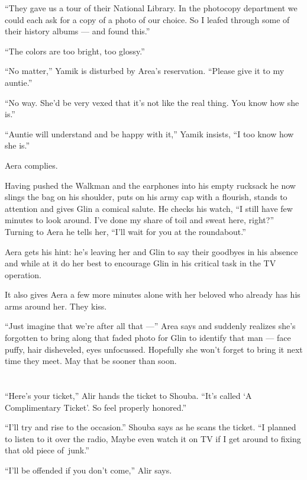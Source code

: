 \documentclass[twoside,11pt]{book}
\begin{document}
``They gave us a tour of their National Library. In the photocopy department we could each ask for a copy
of a photo of our choice. So I leafed through some of their history albums --- and found this.''

``The colors are too bright, too glossy.''

``No matter,'' Yamik is disturbed by Area's reservation. ``Please give it to my
auntie.''

``No way. She'd be very vexed that it's not like the real thing. You know how she is.''

``Auntie will understand and be happy with it,'' Yamik insists, ``I too know how
she is.''

Aera complies.

Having pushed the Walkman and the earphones into his empty rucksack he now slings the bag on his shoulder, puts on his
army cap with a flourish, stands to attention and gives Glin a comical salute. He checks his watch, ``I
still have few minutes to look around. I've done my share of toil and sweat here, right?'' Turning to Aera
he tells her, ``I'll wait for you at the roundabout.''

Aera gets his hint: he's leaving her and Glin to say their goodbyes in his absence and while at it do her best to
encourage Glin in his critical task in the TV operation.

It also gives Aera a few more minutes alone with her beloved who already has his arms around her. They kiss.

``Just imagine that we're after all that ---'' Area says and suddenly realizes she's forgotten
to bring along that faded photo for Glin to identify that man --- face puffy, hair disheveled, eyes unfocussed. Hopefully
she won't forget to bring it next time they meet. May that be sooner than soon.



\chapter{}

``Here's your ticket,'' Alir hands the ticket to Shouba. ``It's called
`A Complimentary Ticket'. So feel properly honored.''

``I'll try and rise to the occasion.'' Shouba says as he scans the ticket. ``I
planned to listen to it over the radio, Maybe even watch it on TV if I get around to fixing that old piece
of~junk.''

``I'll be offended if you don't come,'' Alir says.
\end{document}
